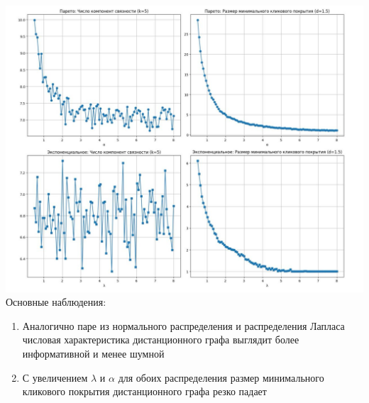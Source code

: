 \documentclass[a4paper,12pt]{article}
\begin{document}
\includegraphics[width=1\textwidth]{images/exp_pareto_graph_1.png}
Основные наблюдения:
\begin{enumerate}
    \item Аналогично паре из нормального распределения и распределения Лапласа числовая характеристика дистанционного графа выглядит более информативной и менее шумной

    \item С увеличением $\lambda$ и $\alpha$ для обоих распределения размер минимального кликового покрытия дистанционного графа резко падает
\end{enumerate}
\end{document}
